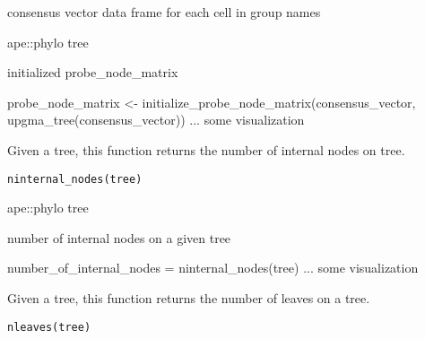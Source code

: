 \documentclass[a4paper]{book}
\begin{document}
%
\begin{Arguments}
\begin{ldescription}
\item[\code{consensus\_vector}] consensus vector data frame for each cell in group 
names

\item[\code{tree}] ape::phylo tree
\end{ldescription}
\end{Arguments}
%
\begin{Value}
initialized probe\_node\_matrix
\end{Value}
%
\begin{Examples}
\begin{ExampleCode}
probe_node_matrix <- initialize_probe_node_matrix(consensus_vector, 
upgma_tree(consensus_vector))
... some visualization 
\end{ExampleCode}
\end{Examples}
%
\begin{Description}\relax
Given a tree, this function returns the number of internal nodes on tree.
\end{Description}
%
\begin{Usage}
\begin{verbatim}
ninternal_nodes(tree)
\end{verbatim}
\end{Usage}
%
\begin{Arguments}
\begin{ldescription}
\item[\code{tree}] ape::phylo tree
\end{ldescription}
\end{Arguments}
%
\begin{Value}
number of internal nodes on a given tree
\end{Value}
%
\begin{Examples}
\begin{ExampleCode}
number_of_internal_nodes = ninternal_nodes(tree)
... some visualization 
\end{ExampleCode}
\end{Examples}
%
\begin{Description}\relax
Given a tree, this function returns the number of leaves on a tree.
\end{Description}
%
\begin{Usage}
\begin{verbatim}
nleaves(tree)
\end{verbatim}
\end{Usage}
\end{document}
